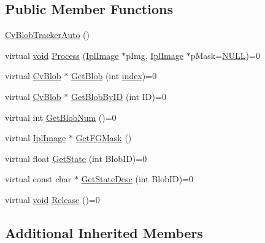 \subsection*{Public Member Functions}
\begin{DoxyCompactItemize}
\item 
\hyperlink{classCvBlobTrackerAuto_a83c46aa2a39f2ee28a6450f16b7e7056}{Cv\-Blob\-Tracker\-Auto} ()
\item 
virtual \hyperlink{legacy_8hpp_a8bb47f092d473522721002c86c13b94e}{void} \hyperlink{classCvBlobTrackerAuto_ab11df58e70c82ebfe3fb342bdbbe95f5}{Process} (\hyperlink{core_2types__c_8h_a249298f383f3b430b476542076320c57}{Ipl\-Image} $\ast$p\-Img, \hyperlink{core_2types__c_8h_a249298f383f3b430b476542076320c57}{Ipl\-Image} $\ast$p\-Mask=\hyperlink{Config_8cpp_a070d2ce7b6bb7e5c05602aa8c308d0c4}{N\-U\-L\-L})=0
\item 
virtual \hyperlink{structCvBlob}{Cv\-Blob} $\ast$ \hyperlink{classCvBlobTrackerAuto_afee10309ddbfff43d5c8d222afd1e780}{Get\-Blob} (int \hyperlink{core__c_8h_a750b5d744c39a06bfb13e6eb010e35d0}{index})=0
\item 
virtual \hyperlink{structCvBlob}{Cv\-Blob} $\ast$ \hyperlink{classCvBlobTrackerAuto_abbcd23b0b6f44102873125cf9805b10c}{Get\-Blob\-By\-I\-D} (int I\-D)=0
\item 
virtual int \hyperlink{classCvBlobTrackerAuto_a9b277edf2fbd8179915aef767a73c52e}{Get\-Blob\-Num} ()=0
\item 
virtual \hyperlink{core_2types__c_8h_a249298f383f3b430b476542076320c57}{Ipl\-Image} $\ast$ \hyperlink{classCvBlobTrackerAuto_a2b30c08937c6583c8f2ef426a2382045}{Get\-F\-G\-Mask} ()
\item 
virtual float \hyperlink{classCvBlobTrackerAuto_a255213573be7fa8b95a464e0376df229}{Get\-State} (int Blob\-I\-D)=0
\item 
virtual const char $\ast$ \hyperlink{classCvBlobTrackerAuto_a6d25aa11058c78843c641be442838c70}{Get\-State\-Desc} (int Blob\-I\-D)=0
\item 
virtual \hyperlink{legacy_8hpp_a8bb47f092d473522721002c86c13b94e}{void} \hyperlink{classCvBlobTrackerAuto_ac2c6d43e08b54d2a7b58d7cf799d6e6a}{Release} ()=0
\end{DoxyCompactItemize}
\subsection*{Additional Inherited Members}



